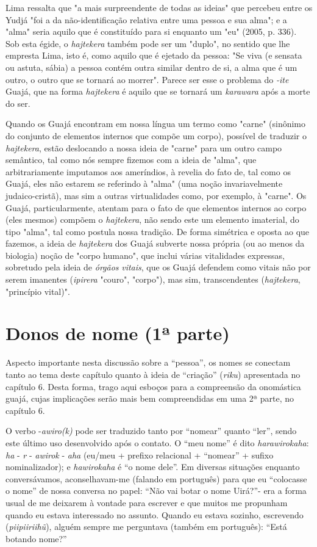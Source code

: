 Lima ressalta que "a mais surpreendente de todas as ideias" que percebeu
entre os Yudjá "foi a da não-identificação relativa entre uma pessoa e
sua alma"; e a "alma" seria aquilo que é constituído para si enquanto um
"eu" (2005, p. 336). Sob esta égide, o \emph{hajtekera} também pode ser
um "duplo", no sentido que lhe empresta Lima, isto é, como aquilo que é
ejetado da pessoa: "Se viva (e sensata ou astuta, sábia) a pessoa contém
outra similar dentro de si, a alma que é um outro, o outro que se
tornará ao morrer". Parece ser esse o problema do \emph{-ite} Guajá, que
na forma \emph{hajtekera} é aquilo que se tornará um \emph{karawara}
após a morte do ser.

Quando os Guajá encontram em nossa língua um termo como "carne"
(sinônimo do conjunto de elementos internos que compõe um corpo),
possível de traduzir o \emph{hajtekera}, estão deslocando a nossa ideia
de "carne" para um outro campo semântico, tal como nós sempre fizemos
com a ideia de "alma", que arbitrariamente imputamos aos ameríndios, à
revelia do fato de, tal como os Guajá, eles não estarem se referindo à
"alma" (uma noção invariavelmente judaico-cristã), mas sim a outras
virtualidades como, por exemplo, à "carne". Os Guajá, particularmente,
atentam para o fato de que elementos internos ao corpo (eles mesmos)
compõem o \emph{hajtekera}, não sendo este um elemento imaterial, do
tipo "alma", tal como postula nossa tradição. De forma simétrica e
oposta ao que fazemos, a ideia de \emph{hajtekera} dos Guajá subverte
nossa própria (ou ao menos da biologia) noção de "corpo humano", que
inclui várias vitalidades expressas, sobretudo pela ideia de
\emph{órgãos} \emph{vitais}, que os Guajá defendem como vitais não por
serem imanentes (\emph{ipirera} "couro", "corpo"), mas sim,
transcendentes (\emph{hajtekera}, "princípio vital)".

\section{Donos de nome (1ª parte)}

Aspecto importante nesta discussão sobre a ``pessoa'', os nomes se
conectam tanto ao tema deste capítulo quanto à ideia de ``criação''
(\emph{riku}) apresentada no capítulo 6. Desta forma, trago aqui esboços
para a compreensão da onomástica guajá, cujas implicações serão mais bem
compreendidas em uma 2ª parte, no capítulo 6.

O verbo -\emph{awiro(k)} pode ser traduzido tanto por ``nomear'' quanto
``ler'', sendo este último uso desenvolvido após o contato. O ``meu
nome'' é dito \emph{harawirokaha}: \emph{ha} - \emph{r} - \emph{awirok}
- \emph{aha} (eu/meu + prefixo relacional + ``nomear'' + sufixo
nominalizador); e \emph{hawirokaha} é ``o nome dele''. Em diversas
situações enquanto conversávamos, aconselhavam-me (falando em português)
para que eu ``colocasse o nome'' de nossa conversa no papel: ``Não vai
botar o nome Uirá?''- era a forma usual de me deixarem à vontade para
escrever e que muitos me propunham quando eu estava interessado no
assunto. Quando eu estava sozinho, escrevendo (\emph{piipiiriihũ}),
alguém sempre me perguntava (também em português): ``Está botando
nome?''


